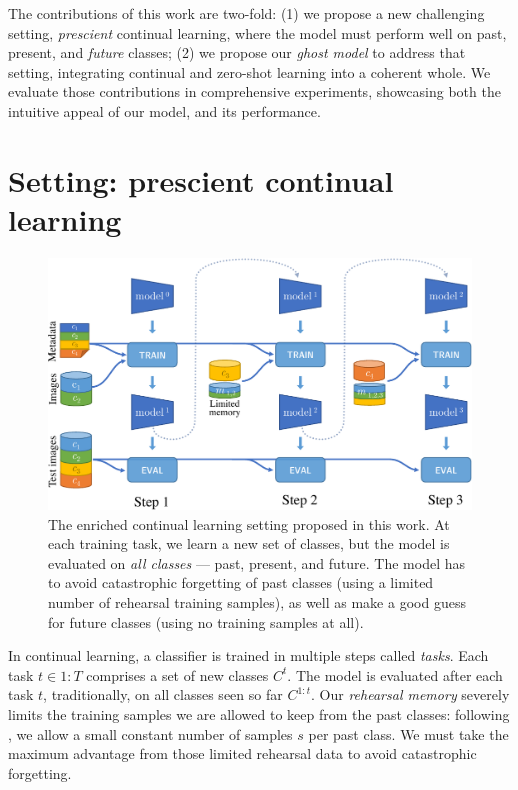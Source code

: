 The contributions of this work are two-fold: (1) we propose a new challenging setting,
\textit{prescient} continual learning, where the model must perform well on past, present, and
\textit{future} classes; (2) we propose our \textit{ghost model} to address that setting,
integrating continual and zero-shot learning into a coherent whole. We evaluate those contributions
in comprehensive experiments, showcasing both the intuitive appeal of our model, and its
performance.


\section{Setting: prescient continual learning}

\label{sec:setting}
\begin{figure}
    \centering
    \includegraphics[width=0.7\linewidth]{images/ghost/protocol.pdf}
    \caption{The enriched continual learning setting proposed in this work. At each training task,
        we learn a new set of classes, but the model is evaluated on \textit{all classes} --- past,
        present, and future. The model has to avoid catastrophic forgetting of past classes (using a
        limited number of rehearsal training samples), as well as make a good guess for future classes
        (using no training samples at all).}
    \label{fig:protocol_zeroshot_continual}
\end{figure}


In continual learning, a classifier is trained in multiple steps called \textit{tasks}. Each task
$t\in{1:T}$ comprises a set of new classes $C^t$. The model is evaluated after each task $t$,
traditionally, on all classes seen so far $C^{1:t}$. Our \textit{rehearsal memory} severely limits
the training samples we are allowed to keep from the past classes: following
\cite{hou2019ucir,douillard2020podnet}, we allow a small constant number of samples $s$ per past
class. We must take the maximum advantage from those limited rehearsal data to avoid catastrophic
forgetting.

